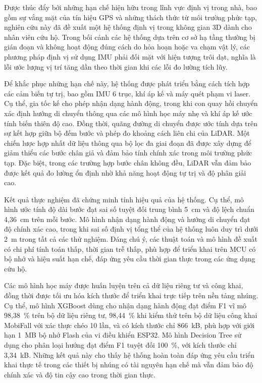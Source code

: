 \label{conclusion}

Được thúc đẩy bởi những hạn chế hiện hữu trong lĩnh vực định vị trong nhà, bao gồm sự vắng mặt của tín hiệu GPS và những thách thức từ môi trường phức tạp, nghiên cứu này đã đề xuất một hệ thống định vị trong không gian 3D dành cho nhân viên cứu hộ. Trong bối cảnh các hệ thống dựa trên cơ sở hạ tầng thường bị gián đoạn và không hoạt động đúng cách do hỏa hoạn hoặc va chạm vật lý, các phương pháp định vị sử dụng IMU phải đối mặt với hiện tượng trôi dạt, nghĩa là lỗi ước lượng vị trí tăng dần theo thời gian khi các lỗi đo lường tích lũy.

Để khắc phục những hạn chế này, hệ thống được phát triển bằng cách tích hợp các cảm biến tự trị, bao gồm IMU 6 trục, khí áp kế và máy quét phạm vi laser. Cụ thể, gia tốc kế cho phép nhận dạng hành động, trong khi con quay hồi chuyển xác định hướng di chuyển thông qua các mô hình học máy nhẹ và khí áp kế ước tính biến thiên độ cao. Đồng thời, quãng đường di chuyển được ước tính dựa trên sự kết hợp giữa bộ đếm bước và phép đo khoảng cách liên chi của LiDAR. Một chiến lược hợp nhất dữ liệu thông qua bộ lọc đa giai đoạn đã được xây dựng để giảm thiểu các bước chân giả và đảm bảo tính chính xác trong môi trường phức tạp. Đặc biệt, trong các trường hợp bước chân không đều, LiDAR vẫn đảm bảo được kết quả đo lường ổn định nhờ khả năng hoạt động tự trị và độ phân giải cao.

Kết quả thực nghiệm đã chứng minh tính hiệu quả của hệ thống. Cụ thể, mô hình ước tính độ dài bước đạt sai số tuyệt đối trung bình 5~cm và độ lệch chuẩn 4,36~cm trên mỗi bước. Mô hình nhận dạng hành động và hướng di chuyển đạt độ chính xác cao, trong khi sai số định vị tổng thể của hệ thống luôn duy trì dưới 2~m trong tất cả các thử nghiệm. Đáng chú ý, các thuật toán và mô hình đề xuất có chi phí tính toán thấp, thời gian trễ thấp, phù hợp để triển khai trên MCU có bộ nhớ và hiệu suất hạn chế, đáp ứng yêu cầu thời gian thực trong các ứng dụng cứu hộ.

Các mô hình học máy được huấn luyện trên cả dữ liệu riêng tư và công khai, đồng thời được tối ưu hóa kích thước để triển khai trực tiếp trên nền tảng nhúng. Cụ thể, mô hình XGBoost dùng cho nhận dạng hành động đạt điểm F1 vĩ mô 98,38~\% trên bộ dữ liệu riêng tư, 98,44~\% khi kiểm thử trên bộ dữ liệu công khai MobiFall với xác thực chéo 10 lần, và có kích thước chỉ 866~kB, phù hợp với giới hạn 1~MB bộ nhớ Flash của vi điều khiển ESP32. Mô hình Decision Tree sử dụng cho phân loại hướng đạt điểm F1 tuyệt đối 100~\%, với kích thước chỉ 3,34~kB. Những kết quả này cho thấy hệ thống hoàn toàn đáp ứng yêu cầu triển khai thực tế trong các thiết bị nhúng có tài nguyên hạn chế mà vẫn đảm bảo độ chính xác và độ tin cậy cao trong thời gian thực.

